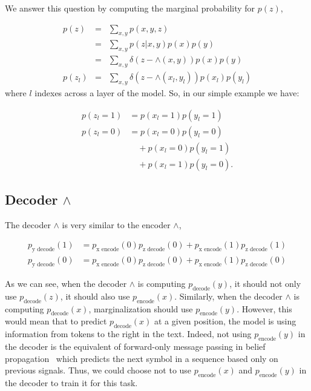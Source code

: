 \documentclass{article}
\begin{document}
We answer this question by computing the marginal probability for $p(z)$,

\begin{eqnarray}
    p(z) &=& \sum_{x, y} p(x, y, z) \nonumber \\
     &=& \sum_{x, y} p(z|x, y)p(x)p(y) \nonumber \\
     &=& \sum_{x, y} \delta(z-\land(x, y))p(x)p(y) \nonumber \\
    p(z_l) &=& \sum_{x, y} \delta(z-\land(x_l, y_l))p(x_l)p(y_l)
\end{eqnarray}
where $l$ indexes across a layer of the model. So, in our simple example we have:

\begin{align}\label{eq:encoder-and}
    p(z_l = 1) &= p(x_l=1)p(y_l=1) \nonumber \\
    p(z_l = 0) 
    &= p(x_l = 0)p(y_l=0) \nonumber \\
    &\quad+ p(x_l = 0)p(y_l=1) \nonumber \\
    &\quad+ p(x_l = 1)p(y_l=0).
\end{align}


\subsection{Decoder $\land$}\label{appendix:decoder-and}

The decoder $\land$ is very similar to the encoder $\land$,

\begin{eqnarray}\label{eq:decoder-and}
    p_{\text{y decode}}(1) &= p_{\text{x encode}}(0)p_{\text{z decode}}(0) + p_{\text{x encode}}(1)p_{\text{z decode}}(1) \nonumber \\
    p_{\text{y decode}}(0) &= p_{\text{x encode}}(0)p_{\text{z decode}}(0) + p_{\text{x encode}}(1)p_{\text{z decode}}(0) 
\end{eqnarray}

As we can see, when the decoder $\land$ is computing $p_{\text{decode}}(y)$, it should not only use $p_{\text{decode}}(z)$, it should also use $p_{\text{encode}}(x)$.
Similarly, when the decoder $\land$ is computing $p_{\text{decode}}(x)$, marginalization should use $p_{\text{encode}}(y)$.  However, this would mean that to predict $p_{\text{decode}}(x)$ at a given position, the model is using information from tokens to the right in the text.  Indeed, not using $p_{\text{encode}}(y)$ in the decoder is the equivalent of forward-only message passing in belief propagation~\citep{BenVigodaThesis, murphy2002dynamic} which predicts the next symbol in a sequence based only on previous signals. Thus, we could choose not to use  $p_{\text{encode}}(x)$ and $p_{\text{encode}}(y)$ in the decoder to train it for this task.
\end{document}
